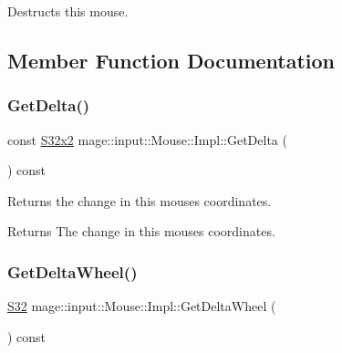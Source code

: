 Destructs this mouse. 

\subsection{Member Function Documentation}
\mbox{\label{classmage_1_1input_1_1_mouse_1_1_impl_aa255160dc9930673d94672ae1e9f43e8}} 
\subsubsection{\texorpdfstring{Get\+Delta()}{GetDelta()}}
{\footnotesize\ttfamily const \mbox{\hyperlink{namespacemage_a4843c424aae7bb5fb6c440ed6ed593ee}{S32x2}} mage\+::input\+::\+Mouse\+::\+Impl\+::\+Get\+Delta (\begin{DoxyParamCaption}{ }\end{DoxyParamCaption}) const\hspace{0.3cm}{\ttfamily [noexcept]}}

Returns the change in this mouse\textquotesingle{}s coordinates.

\begin{DoxyReturn}{Returns}
The change in this mouse\textquotesingle{}s coordinates. 
\end{DoxyReturn}
\mbox{\label{classmage_1_1input_1_1_mouse_1_1_impl_ad2cd4f1d06038ab71e9db2802598bd16}} 
\subsubsection{\texorpdfstring{Get\+Delta\+Wheel()}{GetDeltaWheel()}}
{\footnotesize\ttfamily \mbox{\hyperlink{namespacemage_a642e05c5c83642b6946703615cdbf2da}{S32}} mage\+::input\+::\+Mouse\+::\+Impl\+::\+Get\+Delta\+Wheel (\begin{DoxyParamCaption}{ }\end{DoxyParamCaption}) const\hspace{0.3cm}{\ttfamily [noexcept]}}

